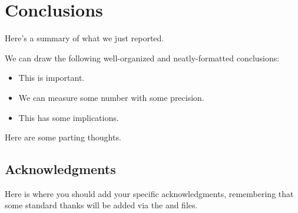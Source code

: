 \documentclass[\docopts]{\docclass}
\begin{document}

\section{Conclusions}
\label{sec:conclusions}

Here's a summary of what we just reported.

We can draw the following well-organized and neatly-formatted conclusions:
\begin{itemize}
  \item This is important.
  \item We can measure some number with some precision.
  \item This has some implications.
\end{itemize}

Here are some parting thoughts.



\subsection*{Acknowledgments}

Here is where you should add your specific acknowledgments, remembering that some standard thanks will be added via the  and  files.







\end{document}
